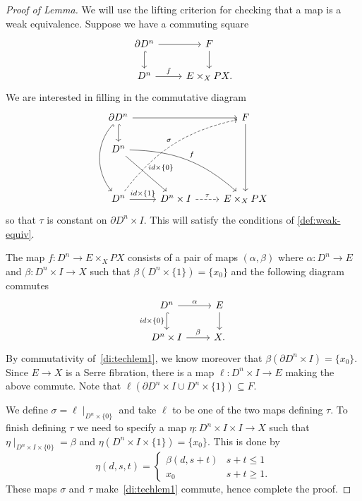 \documentclass{article}
\newtheorem{proposed work}[theorem]{Proposed Work}
\theoremstyle{definition}
\begin{document}
\begin{proof}[Proof of Lemma]
We will use the lifting criterion for checking that a map is a weak
equivalence. Suppose we have a commuting square
\[
\begin{tikzcd}
\partial D^n \arrow[r] \arrow[hookrightarrow]{d} & F \arrow[d] \\
D^n \arrow[r,"f"] & E \times_X PX.
\end{tikzcd}
\]
We are interested in filling in the commutative diagram
\begin{equation}\label{di:techlem1}
\begin{tikzcd}
  \partial D^n \arrow[rr] \arrow[hookrightarrow]{d}
  \arrow[hookrightarrow, bend right=40]{ddd} 
  & 
  & F \arrow[ddd] \\
  D^n \arrow[ddrr,bend left=20,"f"] \arrow["id\times\{0\}"]{ddr} 
  &
  & \\
  &
  & \\
  D^n \arrow["id\times\{1\}"]{r} \arrow[dashed, bend left=20,"\sigma"]{uuurr}
  &D^n\times I \arrow[dashed,"\tau"]{r} 
  & E \times_X PX
\end{tikzcd}
\end{equation}
so that $\tau$ is constant on $\partial D^n \times I$. This will
satisfy the conditions of \ref{def:weak-equiv}.

The map $f: D^n\to E\times_X PX$ consists of a pair of maps
$(\alpha, \beta)$ where $\alpha : D^n\to E$ and
$\beta: D^n\times I \to X$ such that
$\beta( D^n \times \{1\}) = \{x_0\}$ and the following diagram
commutes
\[
\begin{tikzcd}
D^n \arrow[r,"\alpha"] \arrow[hookrightarrow,swap,"id\times \{0\}"]{d} 
& E \arrow[d] 
\\
D^n\times I \arrow[r,"\beta"] 
& X.
\end{tikzcd}
\]
By commutativity of~\eqref{di:techlem1}, we know moreover that
$\beta( \partial D^n \times I ) = \{x_0\}$. Since $E\to X$ is a Serre
fibration, there is a map $\ell : D^n\times I \to E$ making the above
commute. Note that $\ell( \partial D^n\times I \cup D^n\times \{1\})
\subseteq F$.

We define $\sigma = \ell\mid_{D^n\times \{0\}}$ and take $\ell$ to be
one of the two maps defining $\tau$. To finish defining $\tau$ we need
to specify a map $\eta: D^n\times I \times I \to X$ such that
$\eta\mid_{D^n\times I \times \{0\}} = \beta$ and $\eta( D^n\times I
\times \{1\}) = \{x_0\}$. This is done by 
\[
\eta(d, s, t) =  
\begin{cases}
\beta(d,s+t) & s+t\leq 1
\\ x_0 & s+t\geq 1.
\end{cases}
\]
These maps $\sigma$ and $\tau$ make~\eqref{di:techlem1} commute, hence
complete the proof.
\end{proof}
\end{document}

